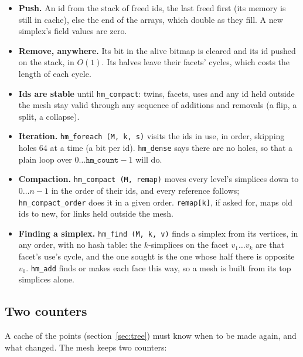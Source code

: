 \documentclass[10pt,a4paper]{article}
\theoremstyle{definition}
\newcommand{\fn}[1]{\texttt{#1}}
\begin{document}
\begin{itemize}
  \item \textbf{Push.} An id from the stack of freed ids, the last freed
    first (its memory is still in cache), else the end of the arrays, which
    double as they fill. A new simplex's field values are zero.
  \item \textbf{Remove, anywhere.} Its bit in the alive bitmap is cleared and
    its id pushed on the stack, in $O(1)$. Its halves leave their facets'
    cycles, which costs the length of each cycle.
  \item \textbf{Ids are stable} until \fn{hm\_compact}: twins, facets, uses
    and any id held outside the mesh stay valid through any sequence of
    additions and removals (a flip, a split, a collapse).
  \item \textbf{Iteration.} \fn{hm\_foreach (M, k, s)} visits the ids in
    use, in order, skipping holes 64 at a time (a bit per id).
    \fn{hm\_dense} says there are no holes, so that a plain loop over $0
    \ldots \fn{hm\_count} - 1$ will do.
  \item \textbf{Compaction.} \fn{hm\_compact (M, remap)} moves every level's
    simplices down to $0 \ldots n - 1$ in the order of their ids, and every
    reference follows; \fn{hm\_compact\_order} does it in a given order.
    \fn{remap[k]}, if asked for, maps old ids to new, for links held
    outside the mesh.
  \item \textbf{Finding a simplex.} \fn{hm\_find (M, k, v)} finds a simplex
    from its vertices, in any order, with no hash table: the $k$-simplices
    on the facet $v_1 \ldots v_k$ are that facet's use's cycle, and the one
    sought is the one whose half there is opposite $v_0$. \fn{hm\_add}
    finds or makes each face this way, so a mesh is built from its top
    simplices alone.
\end{itemize}

\subsection{Two counters}

A cache of the points (section~\ref{sec:tree}) must know when to be made
again, and what changed. The mesh keeps two counters:
\end{document}
